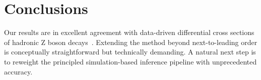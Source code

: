 \section{Conclusions}\label{sec:conclusions}

Our results are in excellent agreement with data-driven differential
cross sections of hadronic Z boson
decays~\cite{TPC:0818-The-Many-Faces-of-the-Eikonal-Factor-September-23-2026}.
Extending the method beyond next-to-leading order is conceptually
straightforward but technically demanding. A natural next step is to
reweight the principled simulation-based inference pipeline with
unprecedented accuracy.

